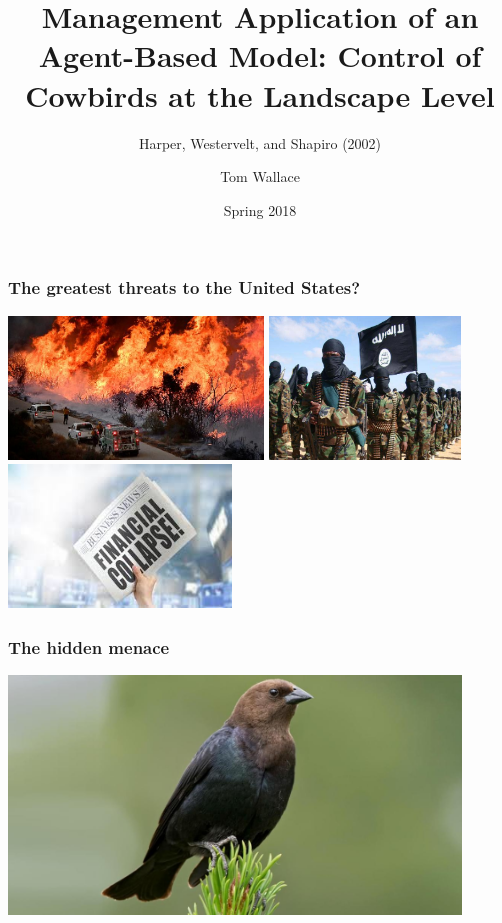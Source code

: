 \documentclass{beamer}
\title{Management Application of an Agent-Based Model: Control of Cowbirds at
the Landscape Level}
\subtitle{Harper, Westervelt, and Shapiro (2002)}
\author{Tom Wallace}
\institute{George Mason University}
\date{Spring 2018}
\begin{document}
\frame{\titlepage}

\begin{frame}
	\frametitle{The greatest threats to the United States?}
	\includegraphics[height=1.5in, keepaspectratio]{fire.jpg}
	\includegraphics[height=1.5in, keepaspectratio]{terrorists.jpg}
	\includegraphics[height=1.5in, keepaspectratio]{collapse.jpeg}
\end{frame}

\begin{frame}
	\frametitle{The hidden menace}
	\begin{center}
		\includegraphics[height=2.5in, keepaspectratio]{bird.jpg}
	\end{center}
\end{frame}
\end{document}
